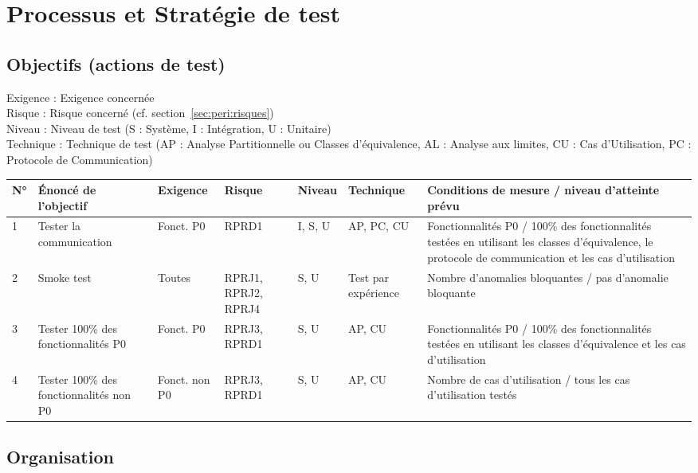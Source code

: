 
\section{Processus et Stratégie de test}
\label{sec:process}

\subsection{Objectifs (actions de test)}
\label{sec:process:objectifs}


\noindent Exigence : Exigence concernée\\
Risque : Risque concerné (cf. section~\ref{sec:peri:risques})\\
Niveau : Niveau de test (S : Système, I : Intégration, U : Unitaire)\\
Technique : Technique de test (AP : Analyse Partitionnelle ou Classes d'équivalence, AL : Analyse aux limites, CU : Cas d'Utilisation, PC : Protocole de Communication)

\noindent\begin{longtable}[c]{|p{0.3cm}|p{2.8cm}|p{1.7cm}|p{1.2cm}|p{1.2cm}|p{1.8cm}|p{3.8cm}|}
\hline
\bf N° & \bf Énoncé de l'objectif & \bf Exigence & \bf Risque & \bf Niveau & \bf Technique & \bf Conditions de mesure / niveau d'atteinte prévu\\
\hline
\endhead
1 & Tester la communication & Fonct. P0 & RPRD1 & I, S, U & AP, PC, CU & Fonctionnalités P0 / 100\% des fonctionnalités testées en utilisant les classes d’équivalence, le protocole de communication et les cas d’utilisation\\
\hline
2 & Smoke test & Toutes & RPRJ1, RPRJ2, RPRJ4 & S, U & Test par expérience & Nombre d’anomalies bloquantes / pas d’anomalie bloquante\\
\hline
3 & Tester 100\% des fonctionnalités P0 & Fonct. P0 & RPRJ3, RPRD1 & S, U & AP, CU & Fonctionnalités P0 / 100\% des fonctionnalités testées en utilisant les classes d’équivalence et les cas d’utilisation\\
\hline
4 & Tester 100\% des fonctionnalités non P0 & Fonct. non P0 & RPRJ3, RPRD1 & S, U & AP, CU & Nombre de cas d’utilisation / tous les cas d’utilisation testés\\
\hline
\end{longtable}

\subsection{Organisation}
\label{sec:process:orga}

